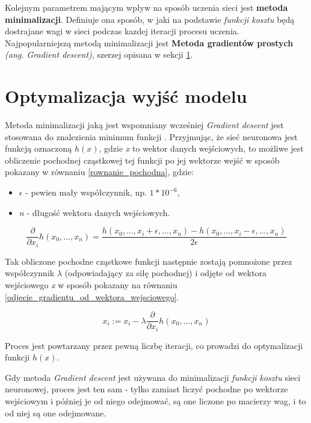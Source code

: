 \documentclass[12pt]{aghdpl}
\begin{document}
			 Kolejnym parametrem mającym wpływ na sposób uczenia sieci jest \textbf{metoda minimalizacji}. Definiuje ona sposób, w jaki na podstawie \textit{funkcji kosztu} będą dostrajane wagi w sieci podczas kazdej iteracji procesu uczenia. Najpopularniejszą metodą minimalizacji jest \textbf{Metoda gradientów prostych} \textit{(ang. Gradient descent)}, szerzej opisana w sekcji \ref{optymalizacja_wyjsc_modelu}.
			 
		\section{Optymalizacja wyjść modelu} \label{optymalizacja_wyjsc_modelu}
		Metoda minimalizacji jaką jest wspomniany wcześniej \textit{Gradient descent} jest stosowana do znalezienia minimum funkcji \cite{cost_function_and_gradient_descent}. Przyjmując, że sieć neuronowa jest funkcją oznaczoną $h(x)$, gdzie \textit{x} to wektor danych wejściowych, to możliwe jest obliczenie pochodnej cząstkowej \cite{pochodna_czastkowa} tej funkcji po jej wektorze wejść w sposób pokazany w równaniu \ref{rownanie_pochodna}, gdzie:
		\begin{itemize}
		\item $\epsilon$ - pewien mały współczynnik, np. $1 * 10^{-6}$,
		\item \textit{n} - długość wektora danych wejściowych.
		\end{itemize}
		
		\begin{equation} \label{rownanie_pochodna}
		\frac{\partial}{\partial x_i}h(x_0, ..., x_n) 
		  = \frac{h(x_0, ..., x_i + \epsilon, ..., x_n) 
		  		  - h(x_0, ..., x_i - \epsilon, ..., x_n)}
			{2 \epsilon}
		\end{equation}
		
		Tak obliczone pochodne cząstkowe funkcji następnie zostają pomnożone przez współczynnik $\lambda$ (odpowiadający za siłę pochodnej) i odjęte od wektora wejściowego \textit{x} w sposób pokazany na równaniu \ref{odjecie_gradientu_od_wektora_wejsciowego}.
		
		\begin{equation} \label{odjecie_gradientu_od_wektora_wejsciowego}
		x_i := x_i - \lambda \frac{\partial}{\partial x_i}h(x_0, ..., x_n)
		\end{equation}
		
		Proces jest powtarzany przez pewną liczbę iteracji, co prowadzi do optymalizacji funkcji $h(x)$.
		
		Gdy metoda \textit{Gradient descent} jest używana do minimalizacji \textit{funkcji kosztu} sieci neuronowej, proces jest ten sam - tylko zamiast liczyć pochodne po wektorze wejściowym i później je od niego odejmować, są one liczone po macierzy wag, i to od niej są one odejmowane.
			
\end{document}

